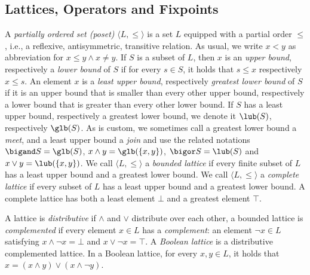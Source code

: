 \subsection{Lattices, Operators and Fixpoints}
A \emph{partially ordered set (poset)} $\langle L,\leq\rangle$ is a set $L$ equipped with a partial order $\leq$, i.e., a reflexive, antisymmetric, transitive relation. 
As usual, we write $x<y$ as abbreviation for $x\leq y \land x\neq y$.
If $S$ is a subset of $L$, then $x$ is an \emph{upper bound}, respectively a \emph{lower bound} of $S$ if for every $s\in S$, it holds that $s\leq x$ respectively $x\leq s$. 
An element $x$ is a \emph{least upper bound}, respectively \emph{greatest lower bound} of $S$ if it is an upper bound that is smaller than every other upper bound, respectively a lower bound that is greater than every other lower bound. 
If $S$ has a  least upper bound, respectively a greatest lower bound, we denote it $\lub(S)$, respectively $\glb(S)$.
As is custom, we  sometimes call a greatest lower bound a \emph{meet}, and a least upper bound a \emph{join} and use the related notations $\bigand S = \glb(S)$, $x\land y=\glb(\{x,y\})$, $\bigor S = \lub(S)$ and $x\lor y=\lub(\{x,y\})$.
 We call $\langle L,\leq\rangle$ a \emph{bounded lattice}  if every finite subset of $L$ has a least upper bound and a greatest lower bound. 
 We call $\langle L,\leq\rangle$ a \emph{complete lattice}  if every subset of $L$ has a least upper bound and a greatest lower bound. 
A complete lattice has both a least element $\bot$ and a greatest element $\top$. 

A lattice is \emph{distributive} if $\land$ and $\lor$ distribute over each other, a bounded lattice is \emph{complemented} if every element $x\in L$ has a \emph{complement}: an element $\lnot x \in L$ satisfying $x\land \lnot x  = \bot$ and $x\lor \lnot x =\top$.
A \emph{Boolean lattice} is a distributive complemented lattice. 
In a Boolean lattice, for every $x,y \in L$, it holds that $x=(x\land y) \lor (x\land \lnot y)$.



